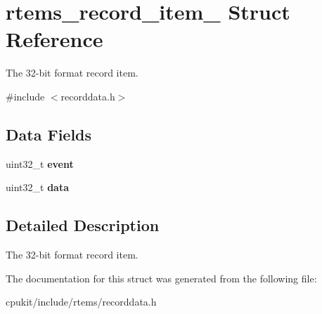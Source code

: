 \hypertarget{structrtems__record__item__32}{}\section{rtems\+\_\+record\+\_\+item\+\_ Struct Reference}
\label{structrtems__record__item__32}


The 32-\/bit format record item.  




{\ttfamily \#include $<$recorddata.\+h$>$}

\subsection*{Data Fields}
\begin{DoxyCompactItemize}
\item 
\mbox{\label{structrtems__record__item__32_a2ca7fc74ea91d65d58a88f4a5c39f9a4}} 
uint32\+\_\+t {\bfseries event}
\item 
\mbox{\label{structrtems__record__item__32_afc73ab2219ab6e002e27ceb653202259}} 
uint32\+\_\+t {\bfseries data}
\end{DoxyCompactItemize}


\subsection{Detailed Description}
The 32-\/bit format record item. 

The documentation for this struct was generated from the following file\+:\begin{DoxyCompactItemize}
\item 
cpukit/include/rtems/recorddata.\+h\end{DoxyCompactItemize}
